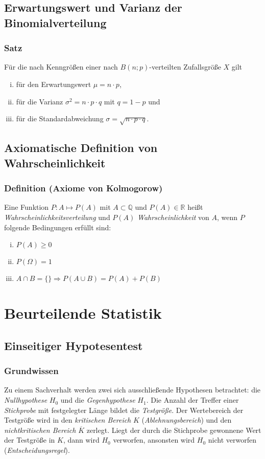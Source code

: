 \documentclass[a4paper,12pt]{article}
\newcommand{\Q}{\mathbb{Q}}
\newcommand{\R}{\mathbb{R}}
\begin{document}
\subsection{Erwartungswert und Varianz der Binomialverteilung}
\subsubsection{Satz}
Für die nach Kenngrößen einer nach $B(n;p)$-verteilten Zufallsgröße $X$ gilt
\begin{enumerate}[(i)]
\item für den Erwartungswert $\mu = n\cdot p$,
\item für die Varianz $\sigma^2 = n\cdot p \cdot q$ mit $q=1-p$ und 
\item für die Standardabweichung $\sigma = \sqrt{n \cdot p\cdot q}$.
\end{enumerate}

\subsection{Axiomatische Definition von Wahrscheinlichkeit}
\subsubsection{Definition (Axiome von Kolmogorow)}
Eine Funktion $P:A\mapsto P(A)$ mit $A \subset \Q$ und $P(A) \in \R $ heißt \emph{Wahrscheinlichkeitsverteilung} und $P(A)$ \emph{Wahrscheinlichkeit} von $A$, wenn $P$ folgende Bedingungen erfüllt sind:
\begin{enumerate}[(i)]
\item $P(A) \geq 0$
\item $P(\Omega)=1$
\item $A \cap B = \{ \} \Rightarrow P(A \cup B)= P(A) + P(B)$
\end{enumerate}

\newpage
\section{Beurteilende Statistik}
\subsection{Einseitiger Hypotesentest}
\subsubsection{Grundwissen}
Zu einem Sachverhalt werden zwei sich ausschließende Hypothesen betrachtet: die \emph{Nullhypothese} $H_0$ und die \emph{Gegenhypothese} $H_1$. Die Anzahl der Treffer einer \emph{Stichprobe} mit festgelegter Länge bildet die \emph{Testgröße}. Der Wertebereich der Testgröße wird in den \emph{kritischen Bereich} $K$ (\emph{Ablehnungsbereich}) und den \emph{nichtkritischen Bereich} $\overline{K}$ zerlegt. Liegt der durch die Stichprobe gewonnene Wert der Testgröße in $K$, dann wird $H_0$ verworfen, ansonsten wird $H_0$ nicht verworfen (\emph{Entscheidungsregel}).
\end{document}
